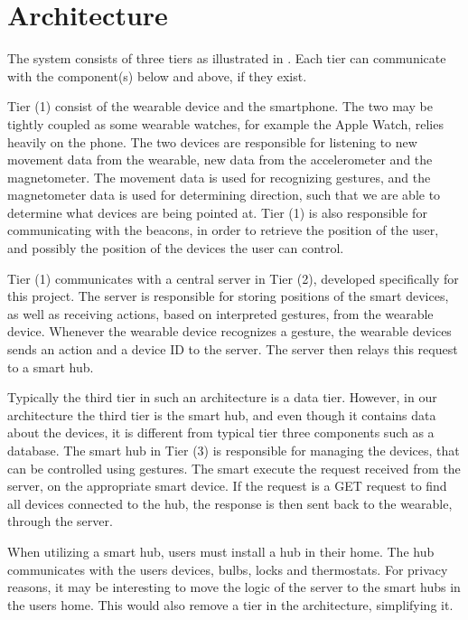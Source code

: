 \section{Architecture}\label{sec:architecture}
The system consists of three tiers as illustrated in . 
Each tier can communicate with the component(s) below and above, if they exist.

Tier (1) consist of the wearable device and the smartphone.
The two may be tightly coupled as some wearable watches, 
for example the Apple Watch, relies heavily on the phone. 
The two devices are responsible for listening to new movement data from the wearable, 
\eg new data from the accelerometer and the magnetometer.
The movement data is used for recognizing gestures, 
and the magnetometer data is used for determining direction, 
such that we are able to determine what devices are being pointed at. 
Tier (1) is also responsible for communicating with the beacons, 
in order to retrieve the position of the user, 
and possibly the position of the devices the user can control. 

Tier (1) communicates with a central server in Tier (2), 
developed specifically for this project. 
The server is responsible for storing positions of the smart devices, 
as well as receiving actions, based on interpreted gestures, from the wearable device.
Whenever the wearable device recognizes a gesture, 
the wearable devices sends an action and a device ID to the server.
The server then relays this request to a smart hub. 

Typically the third tier in such an architecture is a data tier. 
However, in our architecture the third tier is the smart hub, 
and even though it contains data about the devices, 
it is different from typical tier three components such as a database. 
The smart hub in Tier (3) is responsible for managing the devices, 
that can be controlled using gestures. 
The smart execute the request received from the server, 
on the appropriate smart device. 
If the request is a GET request to find all devices connected to the hub, 
the response is then sent back to the wearable, through the server. 

When utilizing a smart hub, users must install a hub in their home. 
The hub communicates with the users devices, \eg bulbs, locks and thermostats. 
For privacy reasons, it may be interesting to move the logic of the server to the smart hubs in the users home. 
This would also remove a tier in the architecture, simplifying it.

